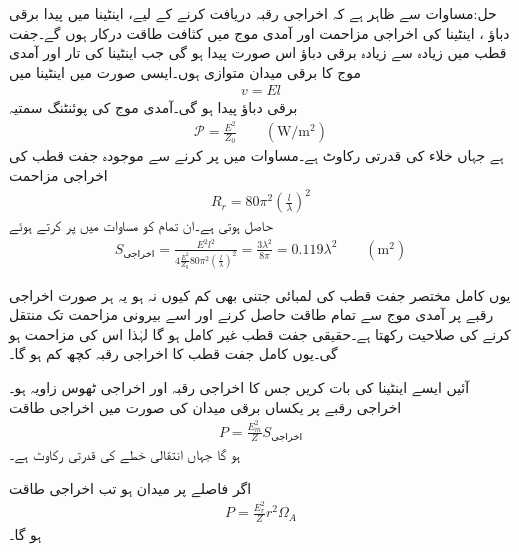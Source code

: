 حل:مساوات  سے ظاہر ہے کہ اخراجی رقبہ دریافت کرنے کے لیے، اینٹینا میں پیدا برقی دباؤ ، اینٹینا کی اخراجی مزاحمت  اور آمدی موج میں کثافت طاقت  درکار ہوں گے۔جفت قطب میں زیادہ سے زیادہ برقی دباؤ اس صورت پیدا ہو گی جب اینٹینا کی تار اور آمدی موج کا برقی میدان متوازی ہوں۔ایسی صورت میں اینٹینا میں
\begin{align}
v=E l
\end{align}
برقی دباؤ پیدا ہو گی۔آمدی موج کی پوئنٹنگ سمتیہ
\begin{align}
\mathscr{P}=\frac{E^2}{Z_0} \quad \quad (\si{\watt/ \meter \squared})
\end{align}
ہے جہاں  خلاء کی قدرتی رکاوٹ ہے۔مساوات  میں  پر کرنے سے موجودہ جفت قطب کی اخراجی مزاحمت
\begin{align}
R_r=80 \pi^2 \left(\frac{l}{\lambda}\right)^2
\end{align}
حاصل ہوتی ہے۔ان تمام کو مساوات  میں پر کرتے ہوئے
\begin{align}
S_{\text{اخراجی}} = \frac{E^2 l^2}{4 \frac{E^2}{Z_0} 80 \pi^2 \left(\frac{l}{\lambda}\right)^2  }=\frac{3\lambda^2}{8\pi}=0.119 \lambda^2 \quad \quad (\si{\meter \squared})
\end{align}

یوں کامل مختصر جفت قطب کی لمبائی جتنی بھی کم کیوں نہ ہو یہ ہر صورت  اخراجی رقبے پر آمدی موج سے تمام طاقت حاصل کرنے اور اسے بیرونی مزاحمت تک منتقل کرنے کی صلاحیت رکھتا ہے۔حقیقی جفت قطب غیر کامل ہو گا  لہٰذا اس کی مزاحمت  ہو گی۔یوں کامل جفت قطب کا اخراجی رقبہ کچھ کم ہو گا۔

آئیں ایسے اینٹینا کی بات کریں جس کا اخراجی رقبہ  اور اخراجی ٹھوس زاویہ  ہو۔اخراجی رقبے پر یکساں برقی میدان  کی صورت میں اخراجی طاقت
\begin{align}
P=\frac{E_m^2}{Z} S_{\text{اخراجی}}
\end{align}
ہو گا جہاں  انتقالی خطے کی قدرتی رکاوٹ ہے۔

اگر  فاصلے پر میدان  ہو تب اخراجی طاقت
\begin{align}
P=\frac{E_r^2}{Z} r^2 \Omega_A
\end{align}
ہو گا۔ 

